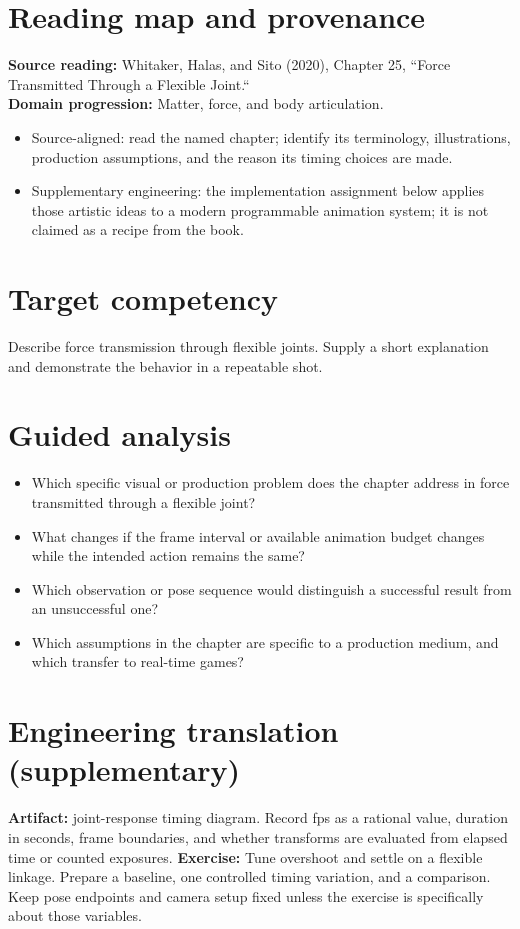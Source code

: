 \documentclass[10pt,letterpaper]{article}
\begin{document}
\makedoctitle
\makedocsummary

\section{Reading map and provenance}
\textbf{Source reading:} Whitaker, Halas, and Sito (2020), Chapter 25, ``Force Transmitted Through a Flexible Joint.``\\
\textbf{Domain progression:} Matter, force, and body articulation.
\begin{itemize}
\item Source-aligned: read the named chapter; identify its terminology, illustrations, production assumptions, and the reason its timing choices are made.
\item Supplementary engineering: the implementation assignment below applies those artistic ideas to a modern programmable animation system; it is not claimed as a recipe from the book.
\end{itemize}
\section{Target competency}
Describe force transmission through flexible joints. Supply a short explanation and demonstrate the behavior in a repeatable shot.
\section{Guided analysis}
\begin{itemize}
\item Which specific visual or production problem does the chapter address in force transmitted through a flexible joint?
\item What changes if the frame interval or available animation budget changes while the intended action remains the same?
\item Which observation or pose sequence would distinguish a successful result from an unsuccessful one?
\item Which assumptions in the chapter are specific to a production medium, and which transfer to real-time games?
\end{itemize}
\section{Engineering translation (supplementary)}
\textbf{Artifact:} joint-response timing diagram. Record fps as a rational value, duration in seconds, frame boundaries, and whether transforms are evaluated from elapsed time or counted exposures.
\textbf{Exercise:} Tune overshoot and settle on a flexible linkage. Prepare a baseline, one controlled timing variation, and a comparison. Keep pose endpoints and camera setup fixed unless the exercise is specifically about those variables.
\end{document}
